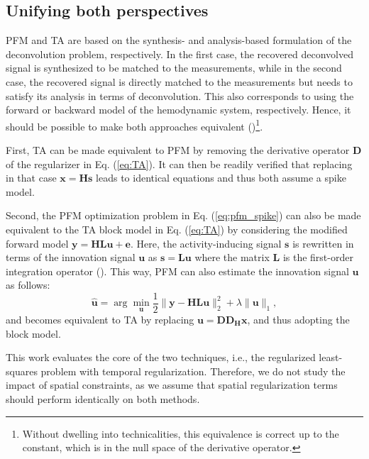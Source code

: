 \subsection{Unifying both perspectives}

PFM and TA are based on the synthesis- and analysis-based formulation of the deconvolution problem, respectively. In the first case, the recovered deconvolved signal is synthesized to be matched to the measurements, while in the second case, the recovered signal is directly matched to the measurements but needs to satisfy its analysis in terms of deconvolution. This also corresponds to using the forward or backward model of the hemodynamic system, respectively. Hence, it should be possible to make both approaches equivalent (\citealt{Elad2007Analysisversussynthesis})\footnote{Without dwelling into technicalities, this equivalence is correct up to the constant, which is in the null space of the derivative operator.}.

First, TA can be made equivalent to PFM by removing the derivative operator $\mathbf{D}$ of the regularizer in Eq. (\ref{eq:TA}). It can then be readily verified that replacing in that case $\mathbf{x}=\mathbf{Hs}$ leads to identical equations and thus both assume a spike model.

Second, the PFM optimization problem in Eq. (\ref{eq:pfm_spike}) can also be made equivalent to the TA block model in Eq. (\ref{eq:TA}) by considering the modified forward model $\mathbf{y} = \mathbf{H L u} + \mathbf{e}$. Here, the activity-inducing signal $\mathbf{s}$ is rewritten in terms of the innovation signal $\mathbf{u}$ as $\mathbf{s}=\mathbf{Lu}$ where the matrix $\mathbf{L}$ is the first-order integration operator (\citealt{Cherkaoui2019SparsitybasedBlind,Urunuela2020StabilityBasedSparse}). This way, PFM can also estimate the innovation signal $\mathbf{u}$ as follows: 
\begin{equation}
    \label{eq:pfm_block}
    \hat{\mathbf{u}} = \arg \min_{\mathbf{u}} \frac{1}{2} \| \mathbf{y} - \mathbf{HLu} \|_2^2 + \lambda \| \mathbf{u} \|_1,
\end{equation}
and becomes equivalent to TA by replacing $\mathbf{u}=\mathbf{D D_H x}$, and thus adopting the block model.

This work evaluates the core of the two techniques, i.e., the regularized least-squares problem with temporal regularization. Therefore, we do not study the impact of spatial constraints, as we assume that spatial regularization terms should perform identically on both methods.

